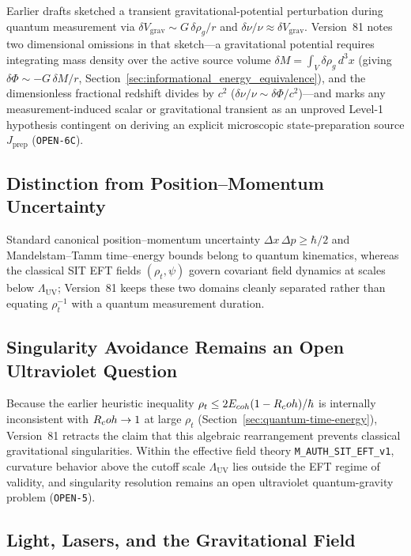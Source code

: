 Earlier drafts sketched a transient gravitational-potential perturbation during quantum measurement via $\delta V_{\mathrm{grav}} \sim G\,\delta\rho_g/r$ and $\delta\nu/\nu \approx \delta V_{\mathrm{grav}}$. Version~81 notes two dimensional omissions in that sketch---a gravitational potential requires integrating mass density over the active source volume $\delta M = \int_V \delta\rho_g\,d^3x$ (giving $\delta\Phi \sim -G\,\delta M/r$, Section~\ref{sec:informational_energy_equivalence}), and the dimensionless fractional redshift divides by $c^2$ ($\delta\nu/\nu \sim \delta\Phi/c^2$)---and marks any measurement-induced scalar or gravitational transient as an unproved Level-1 hypothesis contingent on deriving an explicit microscopic state-preparation source $J_{\mathrm{prep}}$ (\texttt{OPEN-6C}).

\subsection{Distinction from Position--Momentum Uncertainty}
\label{sec:uncertainty-distinction}

Standard canonical position--momentum uncertainty $\Delta x\,\Delta p \ge \hbar/2$ and Mandelstam--Tamm time--energy bounds belong to quantum kinematics, whereas the classical SIT EFT fields $(\rho_t, \psi)$ govern covariant field dynamics at scales below $\Lambda_{\mathrm{UV}}$; Version~81 keeps these two domains cleanly separated rather than equating $\rho_t^{-1}$ with a quantum measurement duration.

\subsection{Singularity Avoidance Remains an Open Ultraviolet Question}
\label{sec:collapse-prevention}

Because the earlier heuristic inequality $\rho_t \le 2E_{coh}(1 - R_coh)/\hbar$ is internally inconsistent with $R_coh \to 1$ at large $\rho_t$ (Section~\ref{sec:quantum-time-energy}), Version~81 retracts the claim that this algebraic rearrangement prevents classical gravitational singularities. Within the effective field theory \texttt{M\_AUTH\_SIT\_EFT\_v1}, curvature behavior above the cutoff scale $\Lambda_{\mathrm{UV}}$ lies outside the EFT regime of validity, and singularity resolution remains an open ultraviolet quantum-gravity problem (\texttt{OPEN-5}).

\subsection{Light, Lasers, and the Gravitational Field}

